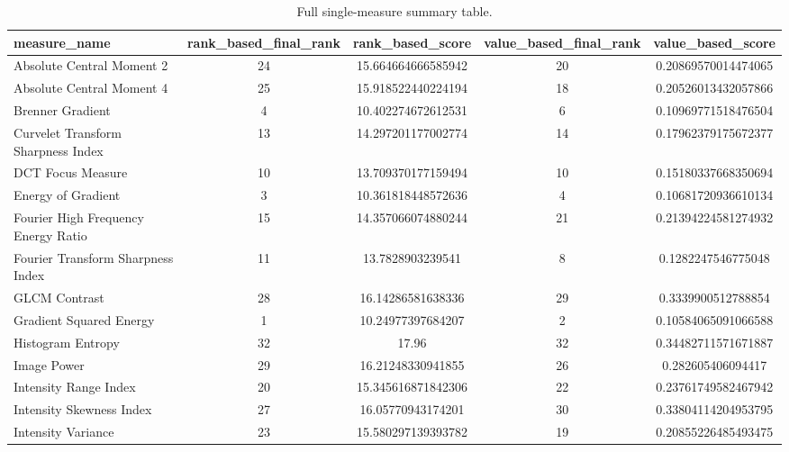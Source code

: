 \begin{table}[t]
\centering
\caption{Full single-measure summary table.}
\begin{tabular}{lcccc}
\hline
measure_name & rank_based_final_rank & rank_based_score & value_based_final_rank & value_based_score \\
\hline
Absolute Central Moment 2 & 24 & 15.664664666585942 & 20 & 0.20869570014474065 \\
Absolute Central Moment 4 & 25 & 15.918522440224194 & 18 & 0.20526013432057866 \\
Brenner Gradient & 4 & 10.402274672612531 & 6 & 0.10969771518476504 \\
Curvelet Transform Sharpness Index & 13 & 14.297201177002774 & 14 & 0.17962379175672377 \\
DCT Focus Measure & 10 & 13.709370177159494 & 10 & 0.15180337668350694 \\
Energy of Gradient & 3 & 10.361818448572636 & 4 & 0.10681720936610134 \\
Fourier High Frequency Energy Ratio & 15 & 14.357066074880244 & 21 & 0.21394224581274932 \\
Fourier Transform Sharpness Index & 11 & 13.7828903239541 & 8 & 0.1282247546775048 \\
GLCM Contrast & 28 & 16.14286581638336 & 29 & 0.3339900512788854 \\
Gradient Squared Energy & 1 & 10.24977397684207 & 2 & 0.10584065091066588 \\
Histogram Entropy & 32 & 17.96 & 32 & 0.34482711571671887 \\
Image Power & 29 & 16.21248330941855 & 26 & 0.282605406094417 \\
Intensity Range Index & 20 & 15.345616871842306 & 22 & 0.23761749582467942 \\
Intensity Skewness Index & 27 & 16.05770943174201 & 30 & 0.33804114204953795 \\
Intensity Variance & 23 & 15.580297139393782 & 19 & 0.20855226485493475 \\
\hline
\end{tabular}
\end{table}
